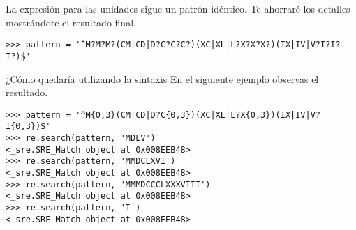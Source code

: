 
La expresión para las unidades sigue un patrón idéntico. Te ahorraré los detalles mostrándote el resultado final.

\noindent\begin{minipage}{\textwidth}
\begin{lstlisting}[mathescape=False]
>>> pattern = '^M?M?M?(CM|CD|D?C?C?C?)(XC|XL|L?X?X?X?)(IX|IV|V?I?I?I?)$'
\end{lstlisting}
\end{minipage}

¿Cómo quedaría utilizando la sintaxis  En el siguiente ejemplo observas el resultado.

\noindent\begin{minipage}{\textwidth}
\begin{lstlisting}[mathescape=False]
>>> pattern = '^M{0,3}(CM|CD|D?C{0,3})(XC|XL|L?X{0,3})(IX|IV|V?I{0,3})$'
>>> re.search(pattern, 'MDLV')
<_sre.SRE_Match object at 0x008EEB48>
>>> re.search(pattern, 'MMDCLXVI')
<_sre.SRE_Match object at 0x008EEB48>
>>> re.search(pattern, 'MMMDCCCLXXXVIII')
<_sre.SRE_Match object at 0x008EEB48>
>>> re.search(pattern, 'I')
<_sre.SRE_Match object at 0x008EEB48>
\end{lstlisting}
\end{minipage}

